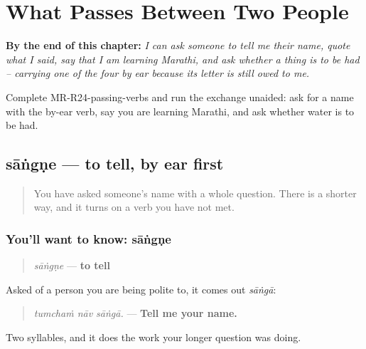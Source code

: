 
\chapter{What Passes Between Two People}
\label{ch:mr-passing-verbs}

\begin{chapteropening}
\textbf{By the end of this chapter:} \emph{I can ask someone to tell me their name, quote what I said, say that I am learning Marathi, and ask whether a thing is to be had -- carrying one of the four by ear because its letter is still owed to me.}

Complete MR-R24-passing-verbs and run the exchange unaided: ask for a name with the by-ear verb, say you are learning Marathi, and ask whether water is to be had.
\end{chapteropening}

\section[\texorpdfstring{\mr{सांगणे} (sāṅgṇe)}{सांगणे (sāṅgṇe)}]{sāṅgṇe — to tell, by ear first}

\label{lesson:MR-C24-sangne}



\begin{quote}
You have asked someone's name with a whole question. There is a shorter way, and it turns on a verb you have not met.
\end{quote}

\subsection*{You'll want to know: sāṅgṇe}
\begin{quote}
\emph{sāṅgṇe} — \textbf{to tell}
\end{quote}

Asked of a person you are being polite to, it comes out \emph{sāṅgā}:

\begin{quote}
\emph{tumchaṁ nāv sāṅgā.} — \textbf{Tell me your name.}
\end{quote}

Two syllables, and it does the work your longer question was doing.

